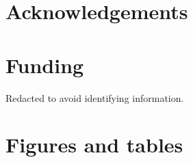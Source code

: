 \documentclass{article}
\begin{document}
\begin{spacing}{1.5}
\section*{Acknowledgements}

\section*{Funding}
Redacted to avoid identifying information.

\end{spacing}

\newpage

 

\newpage

\section*{Figures and tables}
\end{document}
